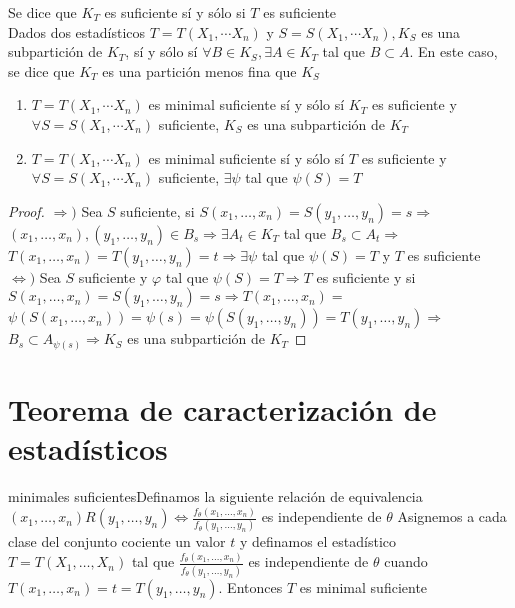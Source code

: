 Se dice que $K_{T}$ es suficiente sí y sólo si $T$ es suficiente\\
Dados dos estadísticos $T=T\left(X_{1}, \cdots X_{n}\right)$ y $S=S\left(X_{1}, \cdots X_{n}\right), K_{S}$ es una subpartición de $K_{T}$, sí y sólo sí $\forall B \in K_{S}, \exists A \in K_{T}$ tal que $B \subset A$. En este caso, se dice que $K_{T}$ es una partición menos fina que $K_{S}$

\begin{definición}
\vspace{-\baselineskip}
\vspace{-\baselineskip}
\begin{enumerate}
	\item $T=T\left(X_{1}, \cdots X_{n}\right)$ es minimal suficiente sí y sólo sí $K_{T}$ es suficiente y $\forall S=S\left(X_{1}, \cdots X_{n}\right)$ suficiente, $K_{S}$ es una subpartición de $K_{T}$\\
	\item $T=T\left(X_{1}, \cdots X_{n}\right)$ es minimal suficiente sí y sólo sí $T$ es suficiente y $\forall S=S\left(X_{1}, \cdots X_{n}\right)$ suficiente, $\exists \psi$ tal que $\psi(S)=T$
\end{enumerate}
\end{definición}

\begin{proof}
	$\Rightarrow)$ Sea $S$ suficiente, si $S\left(x_{1}, \ldots, x_{n}\right)=S\left(y_{1}, \ldots, y_{n}\right)=s \Rightarrow$ $\left(x_{1}, \ldots, x_{n}\right),\left(y_{1}, \ldots, y_{n}\right) \in B_{s} \Rightarrow \exists A_{t} \in K_{T}$ tal que $B_{s} \subset A_{t} \Rightarrow$ $T\left(x_{1}, \ldots, x_{n}\right)=T\left(y_{1}, \ldots, y_{n}\right)=t \Rightarrow \exists \psi$ tal que $\psi(S)=T$ y $T$ es suficiente\\
	$\Leftrightarrow)$ Sea $S$ suficiente y $\varphi$ tal que $\psi(S)=T \Rightarrow T$ es suficiente y si $S\left(x_{1}, \ldots, x_{n}\right)=S\left(y_{1}, \ldots, y_{n}\right)=s \Rightarrow T\left(x_{1}, \ldots, x_{n}\right)=$ $\psi\left(S\left(x_{1}, \ldots, x_{n}\right)\right)=\psi(s)=\psi\left(S\left(y_{1}, \ldots, y_{n}\right)\right)=T\left(y_{1}, \ldots, y_{n}\right) \Rightarrow$ $B_{s} \subset A_{\psi(s)} \Rightarrow K_{S}$ es una subpartición de $K_{T}$
\end{proof}

\section*{Teorema de caracterización de estadísticos}
minimales suficientesDefinamos la siguiente relación de equivalencia $\left(x_{1}, \ldots, x_{n}\right) R\left(y_{1}, \ldots, y_{n}\right) \Leftrightarrow \frac{f_{\theta}\left(x_{1}, \ldots, x_{n}\right)}{f_{\theta}\left(y_{1}, \ldots, y_{n}\right)}$ es independiente de $\theta$ Asignemos a cada clase del conjunto cociente un valor $t$ y definamos el estadístico $T=T\left(X_{1}, \ldots, X_{n}\right)$ tal que $\frac{f_{\theta}\left(x_{1}, \ldots, x_{n}\right)}{f_{\theta}\left(y_{1}, \ldots, y_{n}\right)}$ es independiente de $\theta$ cuando $T\left(x_{1}, \ldots, x_{n}\right)=t=T\left(y_{1}, \ldots, y_{n}\right)$. Entonces $T$ es minimal suficiente

